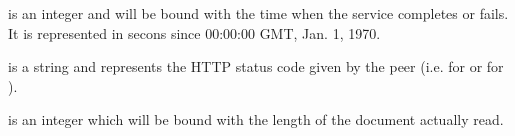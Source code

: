 \documentclass{ozdoc}
\begin{document}
\begin{mozartDESCRIPTION}
 is an integer and will be bound with the time when the service completes or fails. It is represented in secons since 00:00:00 GMT, Jan. 1, 1970.

 is a string and represents the HTTP status code given by the peer (i.e.  for  or  for ).

 is an integer which will be bound with the length of the document actually read. \mozartEMPTY
\end{mozartDESCRIPTION}


\label{SECTION.HTTPCLIENT.SERVICE}
\end{document}
